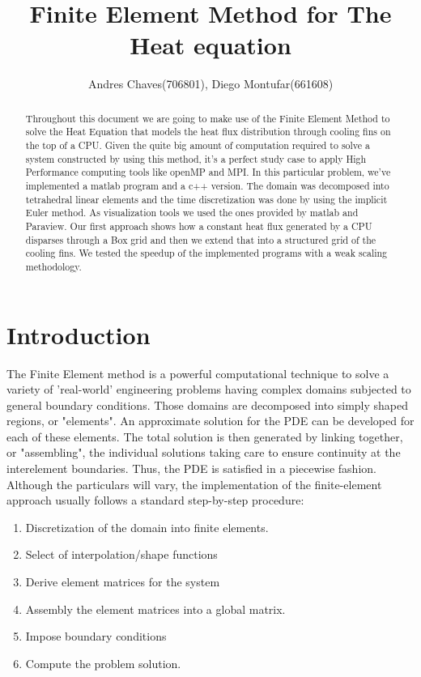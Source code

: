 \documentclass[12pt]{article}
\begin{document}
	\title{Finite Element Method for The Heat equation}
	\author{Andres Chaves(706801), Diego Montufar(661608)}
	
	\maketitle
	
	\begin{abstract}
		Throughout this document we are going to make use of the Finite Element Method to solve the Heat Equation that models the heat flux distribution through cooling fins on the top of a CPU.  Given the quite big amount of computation required to solve a system constructed by using this method, it's a perfect study case to apply High Performance computing tools like openMP and MPI. In this particular problem, we've implemented a matlab program and a c++ version. The domain was decomposed into tetrahedral linear elements and the time discretization was done by using the implicit Euler method. As visualization tools we used the ones provided by matlab and Paraview. Our first approach shows how a constant heat flux generated by a CPU disparses through a Box grid and then we extend that into a structured grid of the cooling fins. We tested the speedup of the implemented programs with a weak scaling methodology.
	\end{abstract}
	
	\section{Introduction}
	The Finite Element method is a powerful computational technique to solve a variety of 'real-world' engineering problems having complex domains subjected to general boundary conditions. Those domains are decomposed into simply shaped regions, or "elements". An approximate solution for the PDE can be developed for each of these elements. The total solution is then generated by linking together, or "assembling", the individual solutions taking care to ensure continuity at the interelement boundaries. Thus, the PDE is satisfied in a piecewise fashion.\\
	
Although the particulars will vary, the implementation of the finite-element approach usually follows a standard step-by-step procedure:\\

\begin{enumerate}
  \item Discretization of the domain into finite elements.
  \item Select of interpolation/shape functions
  \item Derive element matrices for the system
  \item Assembly the element matrices into a global matrix.
  \item Impose boundary conditions
  \item Compute the problem solution.
\end{enumerate}
\end{document}
